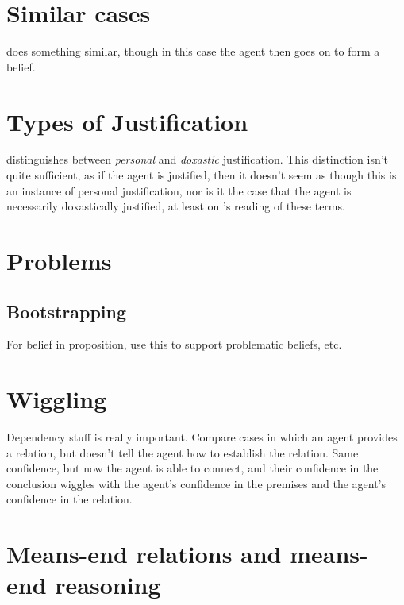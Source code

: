 \documentclass[10pt]{article}
\begin{document}
\section{Similar cases}
\label{sec:similar-cases}

\cite{Lehrer:1971aa} does something similar, though in this case the agent then goes on to form a belief.



\section{Types of Justification}
\label{sec:types-justification}

\textcite{Engel:1992aa} distinguishes between \emph{personal} and \emph{doxastic} justification.
This distinction isn't quite sufficient, as if the agent is justified, then it doesn't seem as though this is an instance of personal justification, nor is it the case that the agent is necessarily doxastically justified, at least on \citeauthor{Engel:1992aa}'s reading of these terms.

\section{Problems}
\label{sec:problems}

\subsection{Bootstrapping}
\label{sec:bootstrapping}

For belief in proposition, use this to support problematic beliefs, etc.

\section{Wiggling}
\label{sec:wiggling}

Dependency stuff is really important.
Compare cases in which an agent provides a relation, but doesn't tell the agent how to establish the relation.
Same confidence, but now the agent is able to connect, and their confidence in the conclusion wiggles with the agent's confidence in the premises and the agent's confidence in the relation.


\newpage

\section{Means-end relations and means-end reasoning}
\label{sec:means-end-relations}
\end{document}
